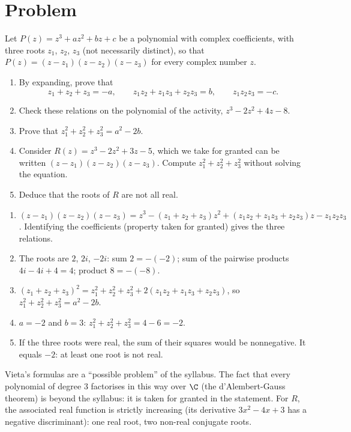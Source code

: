 \mxnewpage
\section{Problem}
\begin{problem}
Let $P(z)=z^3+az^2+bz+c$ be a polynomial with complex coefficients, with three roots $z_1$, $z_2$, $z_3$ (not necessarily distinct), so that $P(z)=(z-z_1)(z-z_2)(z-z_3)$ for every complex number $z$.
\begin{enumerate}
\item By expanding, prove that
\[z_1+z_2+z_3=-a,\qquad z_1z_2+z_1z_3+z_2z_3=b,\qquad z_1z_2z_3=-c.\]
\item Check these relations on the polynomial of the activity, $z^3-2z^2+4z-8$.
\item Prove that $z_1^2+z_2^2+z_3^2=a^2-2b$.
\item Consider $R(z)=z^3-2z^2+3z-5$, which we take for granted can be written $(z-z_1)(z-z_2)(z-z_3)$. Compute $z_1^2+z_2^2+z_3^2$ without solving the equation.
\item Deduce that the roots of $R$ are not all real.
\end{enumerate}
\end{problem}
\begin{solution}[Problem]
\begin{enumerate}
\item $(z-z_1)(z-z_2)(z-z_3)=z^3-(z_1+z_2+z_3)z^2+(z_1z_2+z_1z_3+z_2z_3)z-z_1z_2z_3$. Identifying the coefficients (property taken for granted) gives the three relations.
\item The roots are $2$, $2i$, $-2i$: sum $2=-(-2)$; sum of the pairwise products $4i-4i+4=4$; product $8=-(-8)$.
\item $(z_1+z_2+z_3)^2=z_1^2+z_2^2+z_3^2+2(z_1z_2+z_1z_3+z_2z_3)$, so $z_1^2+z_2^2+z_3^2=a^2-2b$.
\item $a=-2$ and $b=3$: $z_1^2+z_2^2+z_3^2=4-6=-2$.
\item If the three roots were real, the sum of their squares would be nonnegative. It equals $-2$: at least one root is not real.
\end{enumerate}
\end{solution}
\begin{teachernote}
Vieta's formulas are a ``possible problem'' of the syllabus. The fact that every polynomial of degree $3$ factorises in this way over $\C$ (the d'Alembert-Gauss theorem) is beyond the syllabus: it is taken for granted in the statement. For $R$, the associated real function is strictly increasing (its derivative $3x^2-4x+3$ has a negative discriminant): one real root, two non-real conjugate roots.
\end{teachernote}
